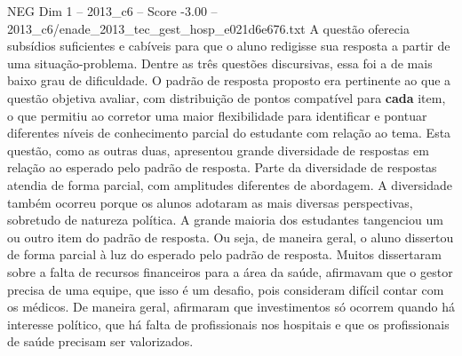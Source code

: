\begin{textsample}{NEG Dim 1 – 2013\_c6 – Score -3.00 – 2013\_c6/enade\_2013\_tec\_gest\_hosp\_e021d6e676.txt}
A questão oferecia subsídios suficientes e cabíveis para que o aluno redigisse sua resposta a partir de uma situação-problema.
Dentre as três questões discursivas, essa foi a de mais baixo grau de dificuldade.
O padrão de resposta proposto era pertinente ao que a questão objetiva avaliar, com distribuição de pontos compatível para \textbf{cada} item, o que permitiu ao corretor uma maior flexibilidade para identificar e pontuar diferentes níveis de conhecimento parcial do estudante com relação ao tema.
Esta questão, como as outras duas, apresentou grande diversidade de respostas em relação ao esperado pelo padrão de resposta.
Parte da diversidade de respostas atendia de forma parcial, com amplitudes diferentes de abordagem.
A diversidade também ocorreu porque os alunos adotaram as mais diversas perspectivas, sobretudo de natureza política.
A grande maioria dos estudantes tangenciou um ou outro item do padrão de resposta.
Ou seja, de maneira geral, o aluno dissertou de forma parcial à luz do esperado pelo padrão de resposta.
Muitos dissertaram sobre a falta de recursos financeiros para a área da saúde, afirmavam que o gestor precisa de uma equipe, que isso é um desafio, pois consideram difícil contar com os médicos.
De maneira geral, afirmaram que investimentos só ocorrem quando há interesse político, que há falta de profissionais nos hospitais e que os profissionais de saúde precisam ser valorizados.

\end{textsample}
